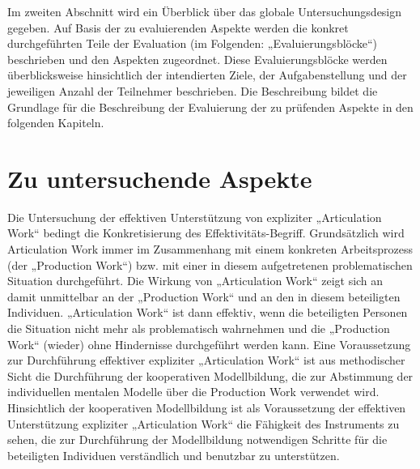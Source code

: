 Im zweiten Abschnitt wird ein Überblick über das globale Untersuchungsdesign gegeben. Auf Basis der zu evaluierenden Aspekte werden die konkret durchgeführten Teile der Evaluation (im Folgenden: „Evaluierungsblöcke“) beschrieben und den Aspekten zugeordnet. Diese Evaluierungsblöcke werden überblicksweise hinsichtlich der intendierten Ziele, der Aufgabenstellung und der jeweiligen Anzahl der Teilnehmer beschrieben. Die Beschreibung bildet die Grundlage für die Beschreibung der Evaluierung der zu prüfenden Aspekte in den folgenden Kapiteln.

\section{Zu untersuchende Aspekte} %
\label{sec:untersuchungsaspekte}

Die Untersuchung der effektiven Unterstützung von expliziter „Articulation Work“ bedingt die Konkretisierung des Effektivitäts-Begriff. Grundsätzlich wird Articulation Work immer im Zusammenhang mit einem konkreten Arbeitsprozess (der „Production Work“) bzw. mit einer in diesem aufgetretenen problematischen Situation durchgeführt. Die Wirkung von „Articulation Work“ zeigt sich an damit unmittelbar an der „Production Work“ und an den in diesem beteiligten Individuen. „Articulation Work“ ist dann effektiv, wenn die beteiligten Personen die Situation nicht mehr als problematisch wahrnehmen und die „Production Work“ (wieder) ohne Hindernisse durchgeführt werden kann. Eine Voraussetzung zur Durchführung effektiver expliziter „Articulation Work“ ist aus methodischer Sicht die Durchführung der kooperativen Modellbildung, die zur Abstimmung der individuellen mentalen Modelle über die Production Work verwendet wird. Hinsichtlich der kooperativen Modellbildung ist als Voraussetzung der effektiven Unterstützung expliziter „Articulation Work“ die Fähigkeit des Instruments zu sehen, die zur Durchführung der Modellbildung notwendigen Schritte für die beteiligten Individuen verständlich und benutzbar zu unterstützen.


